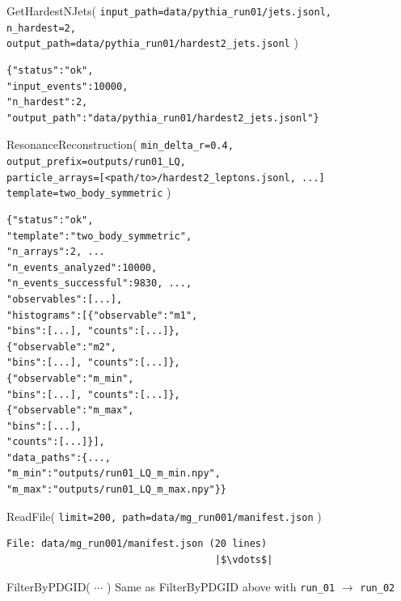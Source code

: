 \documentclass[11pt,oneside]{article}
\numberwithin{equation}{section}
\begin{document}
\begin{orchestralagentmessage}
    \begin{orchestraltoolmessageml}{GetHardestNJets(  \texttt{input\_path=data/pythia\_run01/jets.jsonl,}\\\hphantom{GetHardestNJets(} 
        \texttt{n\_hardest=2,}\\\hphantom{GetHardestNJets(}
        \texttt{output\_path=data/pythia\_run01/hardest2\_jets.jsonl} )}
\begin{verbatim}
{"status":"ok",
"input_events":10000,
"n_hardest":2,
"output_path":"data/pythia_run01/hardest2_jets.jsonl"}
\end{verbatim}
    \end{orchestraltoolmessageml}


    \begin{orchestraltoolmessageml}{ResonanceReconstruction( \texttt{min\_delta\_r=0.4, output\_prefix=outputs/run01\_LQ,}\\\hphantom{ResonanceReconstruction(} \texttt{particle\_arrays=[<path/to>/hardest2\_leptons.jsonl, ...]}\\\hphantom{ResonanceReconstruction(}
    \texttt{template=two\_body\_symmetric} )}
\begin{verbatim}
{"status":"ok",
"template":"two_body_symmetric",
"n_arrays":2, ...
"n_events_analyzed":10000,
"n_events_successful":9830, ...,
"observables":[...],
"histograms":[{"observable":"m1",
"bins":[...], "counts":[...]},
{"observable":"m2",
"bins":[...], "counts":[...]},
{"observable":"m_min",
"bins":[...], "counts":[...]},
{"observable":"m_max",
"bins":[...],
"counts":[...]}],
"data_paths":{...,
"m_min":"outputs/run01_LQ_m_min.npy",
"m_max":"outputs/run01_LQ_m_max.npy"}}
\end{verbatim}
    \end{orchestraltoolmessageml}


    \begin{orchestraltoolmessage}{ReadFile( \texttt{limit=200, path=data/mg\_run001/manifest.json} )}
\begin{verbatim}
File: data/mg_run001/manifest.json (20 lines)
                                    |$\vdots$|
\end{verbatim}
    \end{orchestraltoolmessage}


    \begin{orchestraltoolmessage}{FilterByPDGID( $\cdots$ )
        }
    Same as \textsf{FilterByPDGID} above with \texttt{run\_01} $\to$ \texttt{run\_02}
    \end{orchestraltoolmessage}



\end{orchestralagentmessage}
\end{document}
